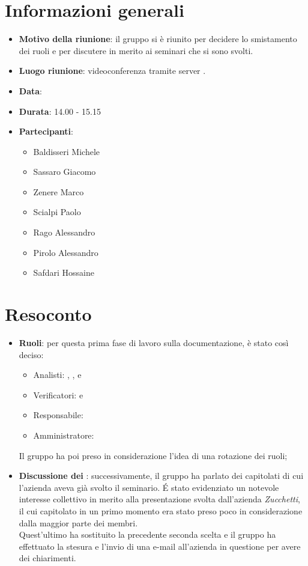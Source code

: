 \section{Informazioni generali}
\begin{itemize}
\item \textbf{Motivo della riunione}: il gruppo si è riunito per decidere lo smistamento dei ruoli e per discutere in merito ai seminari che si sono svolti.
\item \textbf{Luogo riunione}: videoconferenza tramite server .
\item \textbf{Data}: \Data{}
\item \textbf{Durata}: 14.00 - 15.15
\item \textbf{Partecipanti}:
	\begin{itemize}
	\item Baldisseri Michele
	\item Sassaro Giacomo
	\item Zenere Marco
	\item Scialpi Paolo
	\item Rago Alessandro
	\item Pirolo Alessandro
	\item Safdari Hossaine
	\end{itemize}
\end{itemize}
\newpage
\section{Resoconto}
\begin{itemize}
\item \textbf{Ruoli}: per questa prima fase di lavoro sulla documentazione, è stato così deciso:
\begin{itemize}
\item Analisti: \SH{}, \ZM{}, \RA{} e \SP{}
\item Verificatori: \PA{} e \BM{} 
\item Responsabile: \SG{}
\item Amministratore: \BM{}
\end{itemize}
Il gruppo ha poi preso in considerazione l'idea di una rotazione dei ruoli;

\item \textbf{Discussione dei }: successivamente, il gruppo ha parlato dei capitolati di cui l'azienda aveva già svolto il seminario. \'E stato evidenziato un notevole interesse collettivo in merito alla presentazione svolta dall'azienda \textit{Zucchetti}, il cui capitolato in un primo momento era stato preso poco in considerazione dalla maggior parte dei membri.\\ Quest'ultimo ha sostituito la precedente seconda scelta e il gruppo ha effettuato la stesura e l'invio di una e-mail all'azienda in questione per avere dei chiarimenti.
\end{itemize}